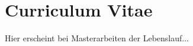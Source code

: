 \cleardoublepage

\chapter*{Curriculum Vitae}

\thispagestyle{empty}

Hier erscheint bei Masterarbeiten der Lebenslauf...